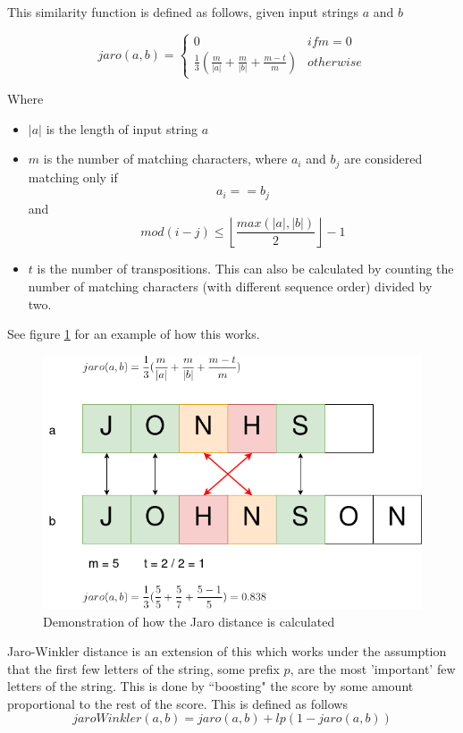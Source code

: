 \documentclass[a4paper,11pt]{article}
\begin{document}
This similarity function is defined as follows, given input strings $a$ and $b$ \citep{jaroDescription}

\begin{equation}
    jaro(a,b) = \left\{\begin{matrix}
0 & if m=0\\ 
\frac{1}{3}(\frac{m}{|a|} + \frac{m}{|b|} + \frac{m-t}{m}) & otherwise 
\end{matrix}\right.
\end{equation}

Where 
\begin{itemize}
    \item $|a|$ is the length of input string $a$
    \item $m$ is the number of matching characters, where $a_i$ and $b_j$ are considered matching only if
    \begin{equation}
        a_i == b_j
    \end{equation}
    and
    \begin{equation}
        mod(i - j) \leq \left \lfloor \frac{max(|a|,|b|)}{2} \right \rfloor - 1
    \end{equation}
    \item $t$ is the number of transpositions. This can also be calculated by counting the number of matching characters (with different sequence order) divided by two.
\end{itemize}

See figure \ref{fig:jaroDemo} for an example of how this works.

\begin{figure}[H]
    \centering
    \includegraphics[width=0.7\linewidth]{diagrams/jaroDemo.drawio.png}
    \caption{Demonstration of how the Jaro distance is calculated}
    \label{fig:jaroDemo}
\end{figure}

Jaro-Winkler distance is an extension of this which works under the assumption that the first few letters of the string, some prefix $p$, are the most 'important' few letters of the string. This is done by ``boosting" the score by some amount proportional to the rest of the score. This is defined as follows \citep{jaroWinklerOriginalPaper}
\begin{equation}
    jaroWinkler(a,b) = jaro(a,b) + lp(1-jaro(a,b))
\end{equation}
\end{document}
